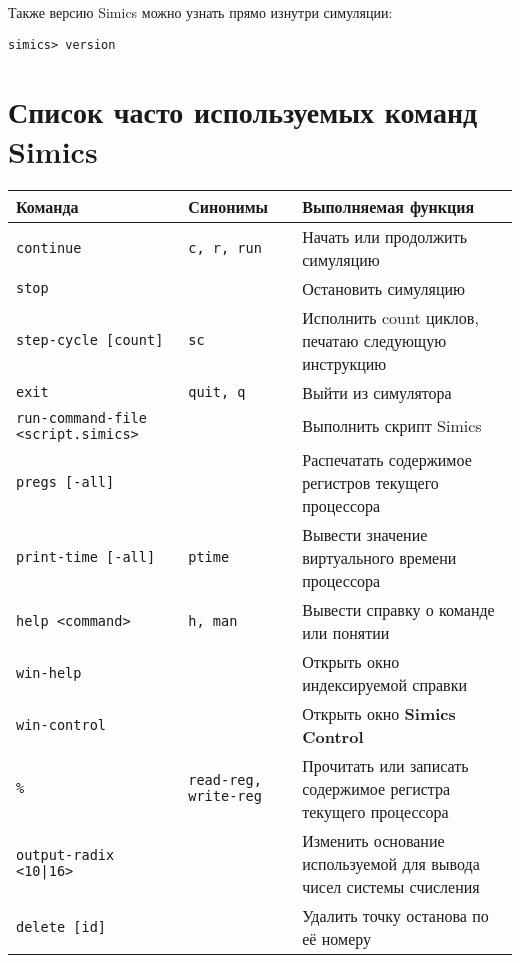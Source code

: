 Также версию Simics можно узнать прямо изнутри симуляции:

\begin{lstlisting}
simics> version
\end{lstlisting}

\section{Список часто используемых команд Simics}

\begin{center}
\begin{tabularx}{\textwidth}{|X|X|p{}|}\hline
\textbf{Команда}                          & \textbf{Синонимы}  & \textbf{Выполняемая функция}\\\hline
\texttt{continue}                         & \texttt{c, r, run} & Начать или продолжить симуляцию\\\hline
\texttt{stop}     						  &                    & Остановить симуляцию\\\hline
\texttt{step-cycle [count]}				  & \texttt{sc}		   & Исполнить count циклов, печатаю следующую инструкцию\\\hline
\texttt{exit}     						  & \texttt{quit, q}   & Выйти из симулятора\\\hline
\texttt{run-command-file <script.simics>} &                    & Выполнить скрипт Simics\\\hline
\texttt{pregs [-all]}                     &                    & Распечатать содержимое регистров текущего процессора\\\hline
\texttt{print-time [-all]}                & \texttt{ptime}     & Вывести значение виртуального времени процессора\\\hline
\texttt{help <command>}                   & \texttt{h, man}    & Вывести справку о команде или понятии \\\hline
\texttt{win-help}                         &                    & Открыть окно индексируемой справки \\\hline
\texttt{win-control}                      &                    & Открыть окно \textbf{Simics Control}\\\hline
\texttt{\%<register name>}                & \texttt{read-reg, write-reg} & Прочитать или записать содержимое регистра текущего процессора \\\hline
\texttt{output-radix <10|16>}             &                    & Изменить основание используемой для вывода чисел системы счисления\\\hline
\texttt{delete [id]}                      &                    & Удалить точку останова по её номеру \\\hline
\end{tabularx}

\end{center}




